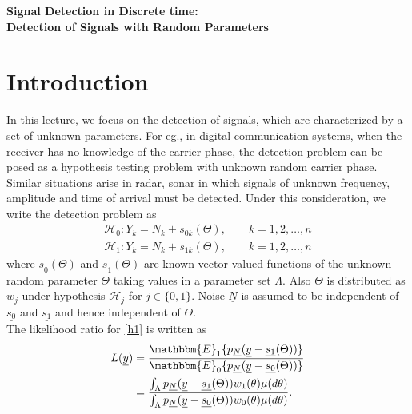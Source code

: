 \documentclass[12pt]{report}
\begin{document}
	\maketitle
	
	\begin{center}
		{\Large \bf Signal Detection in Discrete time: \\Detection of Signals with Random Parameters}
	\end{center}
	
	
	\section{Introduction}
	In this lecture, we focus on the detection of signals, which are characterized by a set of unknown parameters. For eg., in digital communication systems, when the receiver has no 
	knowledge of the carrier phase, the detection problem can be posed as a hypothesis testing problem with unknown random carrier phase. Similar situations arise in radar, sonar in which
	signals of unknown frequency, amplitude and time of arrival must be detected.
	Under this consideration, we write the detection problem as
	\begin{equation}
	\label{h1}
	\begin{aligned}
	\mathcal{H}_{0} : Y_{k} = N_{k} + s_{0k}(\Theta) ,\qquad k = 1, 2, \ldots, n\\
	\mathcal{H}_{1} : Y_{k} = N_{k} + s_{1k}(\Theta) ,\qquad k = 1, 2, \ldots, n
	\end{aligned}
	\end{equation}
	where $\underline{s}_0(\Theta)$ and $\underline{s}_1(\Theta)$ are known vector-valued functions of the unknown random parameter $\Theta$ taking values in a parameter set $\Lambda$.
	Also $\Theta$ is distributed as $w_{j}$ under hypothesis $\mathcal{H}_{j}$ for $j\in \{0,1\}$. Noise $\underline{N}$ is assumed to be independent of $\underline{s_{0}}$ and $\underline{s_{1}}$ and 
	hence independent of $\Theta$.
	\\
	The likelihood ratio for \eqref{h1} is written as
	\begin{equation}
	\label{l1}
	\begin{aligned}
	L(\underline{y}) &= \frac{\mathbbm{E}_{1} \lbrace {p_{\underline{N}}(\underline{y} - \underline{s_{1}}(\Theta))} \rbrace }{\mathbbm{E}_0 \lbrace {p_{\underline{N}}(\underline{y} - \underline{s_{0}}(\Theta))} \rbrace } \\		
	&=  \frac{\int_{\Lambda} p_{\underline{N}}(\underline{y} - \underline{s_{1}}(\Theta)) w_{1}(\theta)\mu (d\theta)}{\int_{\Lambda} p_{\underline{N}}(\underline{y} - \underline{s_{0}}(\Theta)) w_{0}(\theta)\mu (d\theta)}.
	\end{aligned}	
	\end{equation}
\end{document}
